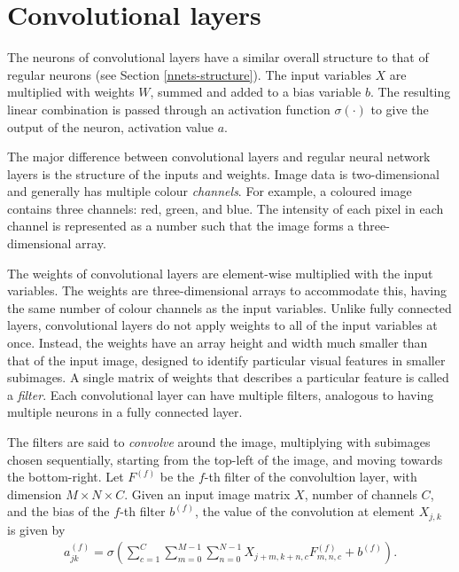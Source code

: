 \section{Convolutional layers}\label{convnets-convlayer}

The neurons of convolutional layers have a similar overall structure to that of regular neurons (see Section \ref{nnets-structure}). The input variables $X$ are multiplied with weights $W$, summed and added to a bias variable $b$. The resulting linear combination is passed through an activation function $\sigma(\cdot)$ to give the output of the neuron, activation value $a$.

The major difference between convolutional layers and regular neural network layers is the structure of the inputs and weights. Image data is two-dimensional and generally has multiple colour \textit{channels}. For example, a coloured image contains three channels: red, green, and blue. The intensity of each pixel in each channel is represented as a number such that the image forms a three-dimensional array. 

The weights of convolutional layers are element-wise multiplied with the input variables. The weights are three-dimensional arrays to accommodate this, having the same number of colour channels as the input variables. Unlike fully connected layers, convolutional layers do not apply weights to all of the input variables at once. Instead, the weights have an array height and width much smaller than that of the input image, designed to identify particular visual features in smaller subimages. A single matrix of weights that describes a particular feature is called a \textit{filter}. Each convolutional layer can have multiple filters, analogous to having multiple neurons in a fully connected layer.

The filters are said to \textit{convolve} around the image, multiplying with subimages chosen sequentially, starting from the top-left of the image, and moving towards the bottom-right. Let $F^{(f)}$ be the $f$-th filter of the convolultion layer, with dimension $M\times N \times C$. Given an input image matrix $X$, number of channels $C$, and the bias of the $f$-th filter $b^{(f)}$, the value of the convolution at element $X_{j,k}$ is given by
\begin{align}
	a_{jk}^{(f)} = \sigma\left(\sum_{c=1}^C\sum_{m=0}^{M-1}\sum_{n=0}^{N-1}X_{j+m, k+n, c}F_{m,n,c}^{(f)}  + b^{(f)}\right).
\end{align}


